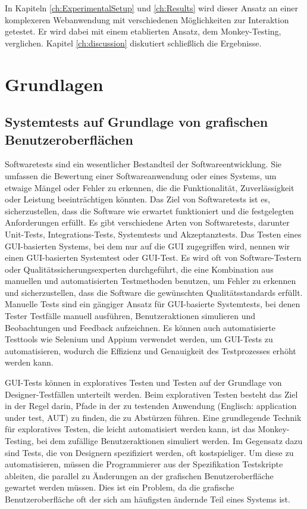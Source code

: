 In Kapiteln \ref{ch:ExperimentalSetup} und \ref{ch:Results} wird dieser Ansatz an einer komplexeren Webanwendung mit verschiedenen Möglichkeiten zur Interaktion getestet.
Er wird dabei mit einem etablierten Ansatz, dem Monkey-Testing, verglichen.
Kapitel \ref{ch:discussion} diskutiert schließlich die Ergebnisse.


\chapter{Grundlagen}
\label{ch:Foundations}

\section{Systemtests auf Grundlage von grafischen Benutzeroberflächen}
\label{sec:Foundations:GUIBasedSystemTests}
Softwaretests sind ein wesentlicher Bestandteil der Softwareentwicklung.
Sie umfassen die Bewertung einer Softwareanwendung oder eines Systems, um etwaige Mängel oder Fehler zu erkennen, die die Funktionalität, Zuverlässigkeit oder Leistung beeinträchtigen könnten.
Das Ziel von Softwaretests ist es, sicherzustellen, dass die Software wie erwartet funktioniert und die festgelegten Anforderungen erfüllt.
Es gibt verschiedene Arten von Softwaretests, darunter Unit-Tests, Integrations-Tests, Systemtests und Akzeptanztests.
Das Testen eines GUI-basierten Systems, bei dem nur auf die GUI zugegriffen wird, nennen wir einen GUI-basierten Systemtest oder GUI-Test.
Es wird oft von Software-Testern oder Qualitätssicherungsexperten durchgeführt, die eine Kombination aus manuellen und automatisierten Testmethoden benutzen, um Fehler zu erkennen und sicherzustellen, dass die Software die gewünschten Qualitätsstandards erfüllt.
Manuelle Tests sind ein gängiger Ansatz für GUI-basierte Systemtests, bei denen Tester Testfälle manuell ausführen, Benutzeraktionen simulieren und Beobachtungen und Feedback aufzeichnen.
Es können auch automatisierte Testtools wie Selenium und Appium verwendet werden, um GUI-Tests zu automatisieren, wodurch die Effizienz und Genauigkeit des Testprozesses erhöht werden kann.

GUI-Tests können in exploratives Testen und Testen auf der Grundlage von Designer-Testfällen unterteilt werden.
Beim explorativen Testen besteht das Ziel in der Regel darin, Pfade in der zu testenden Anwendung (Englisch: \foreignlanguage{english}{application under test}, AUT) zu finden, die zu Abstürzen führen.
Eine grundlegende Technik für exploratives Testen, die leicht automatisiert werden kann, ist das Monkey-Testing, bei dem zufällige Benutzeraktionen simuliert werden.
Im Gegensatz dazu sind Tests, die von Designern spezifiziert werden, oft kostspieliger.
Um diese zu automatisieren, müssen die Programmierer aus der Spezifikation Testskripte ableiten, die parallel zu Änderungen an der grafischen Benutzeroberfläche gewartet werden müssen.
Dies ist ein Problem, da die grafische Benutzeroberfläche oft der sich am häufigsten ändernde Teil eines Systems ist.

